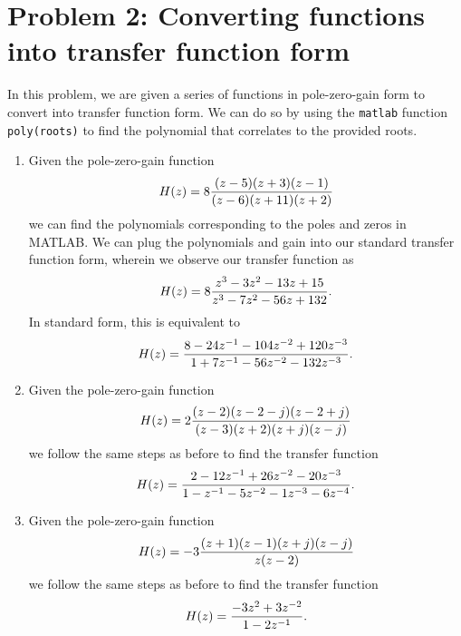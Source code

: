 \documentclass[11pt]{article}
\begin{document}
\section{Problem 2: Converting functions into transfer function form}
In this problem, we are given a series of functions in pole-zero-gain form
to convert into transfer function form. We can do so by using the \texttt{matlab} function
\texttt{poly(roots)} to find the polynomial that correlates to the provided roots.
\begin{enumerate}[label=\textbf{\alph*)}, leftmargin=2.6em]
    \item Given the pole-zero-gain function
    \begin{equation} \notag
        H(z) = 8 \frac{(z-5)(z+3)(z-1)}{(z-6)(z+11)(z+2)}
    \end{equation}
    we can find the polynomials corresponding to the poles and zeros in MATLAB. We 
    can plug the polynomials and gain into our standard transfer function form, wherein we observe
    our transfer function as
    \begin{equation} \notag
        H(z) = 8\frac{z^3-3z^2-13z+15}{z^3-7z^2-56z+132}.
    \end{equation}
    In standard form, this is equivalent to
    \begin{equation} \notag
        H(z) = \frac{8-24z^{-1}-104z^{-2}+120z^{-3}}{1+7z^{-1}-56z^{-2}-132z^{-3}}.
    \end{equation}

    \item Given the pole-zero-gain function
    \begin{equation} \notag
        H(z) = 2\frac{(z-2)(z-2-j)(z-2+j)}{(z-3)(z+2)(z+j)(z-j)}
    \end{equation}
    we follow the same steps as before to find the transfer function
    \begin{equation} \notag
        H(z) = \frac{2-12z^{-1}+26z^{-2}-20z^{-3}}{1-z^{-1}-5z^{-2}-1z^{-3}-6z^{-4}}.
    \end{equation}

    \item Given the pole-zero-gain function
    \begin{equation} \notag
        H(z) = -3\frac{(z+1)(z-1)(z+j)(z-j)}{z(z-2)}
    \end{equation}
    we follow the same steps as before to find the transfer function
    \begin{equation} \notag
        H(z) = \frac{-3z^2+3z^{-2}}{1-2z^{-1}}.
    \end{equation}
\end{enumerate}
\end{document}
